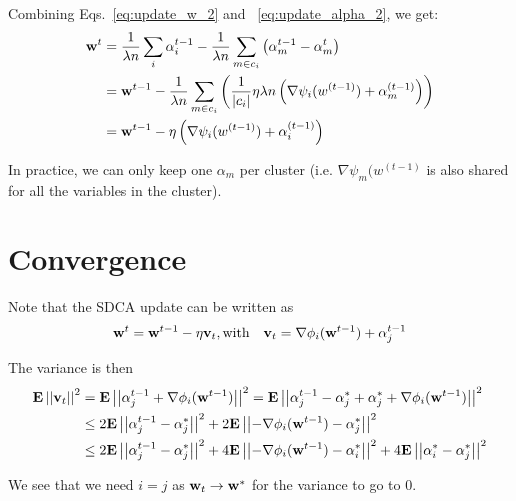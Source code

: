 \documentclass{article}
\begin{document}
Combining Eqs.~\ref{eq:update_w_2} and ~\ref{eq:update_alpha_2}, we get:
\begin{align}
{\bf w}^t &= \frac{1}{\lambda n} \sum_i \alpha_i^{t-1} - \frac{1}{\lambda n} \sum_{m \in c_i} \left( \alpha_m^{t-1} - \alpha_m^{t} \right) \nonumber \\
&= {\bf w}^{t-1} - \frac{1}{\lambda n} \sum_{m \in c_i} \left( \frac{1}{|c_i|} \eta \lambda n \left( \nabla \psi_i(w^{(t-1)}) + \alpha_m^{(t-1)} \right) \right) \nonumber \\
&= {\bf w}^{t-1} - \eta \left( \nabla \psi_i(w^{(t-1)}) + \alpha_i^{(t-1)} \right) \nonumber
\end{align}

In practice, we can only keep one $\alpha_m$ per cluster (i.e. $\nabla \psi_m(w^{(t-1)}$ is also shared for all the variables in the cluster).

\section{Convergence}

Note that the SDCA update can be written as
$$
{\bf w}^t = {\bf w}^{t-1} - \eta {\bf v}_t, \text{with} \quad {\bf v}_t = \nabla \phi_i ({\bf w}^{t-1}) + \alpha_j^{t-1}
$$

The variance is then
\begin{align}
{\mathbf E} \left|\left|{\bf v}_t\right|\right|^2 &= {\mathbf E} \left|\left|\alpha_j^{t-1} + \nabla \phi_i ({\bf w}^{t-1})\right|\right|^2 = {\mathbf E} \left|\left|\alpha_j^{t-1} - \alpha_j^* + \alpha_j^* + \nabla \phi_i ({\bf w}^{t-1})\right|\right|^2 \nonumber \\
&\leq 2 {\mathbf E} \left|\left|\alpha_j^{t-1} - \alpha_j^*\right|\right|^2 + 2 {\mathbf E} \left|\left|- \nabla \phi_i ({\bf w}^{t-1}) - \alpha_j^*\right|\right|^2 \nonumber \\
&\leq 2 {\mathbf E} \left|\left|\alpha_j^{t-1} - \alpha_j^*\right|\right|^2 \nonumber
+ 4 {\mathbf E} \left|\left|- \nabla \phi_i ({\bf w}^{t-1}) - \alpha_i^*\right|\right|^2 + 4 {\mathbf E} \left|\left|\alpha_i^* - \alpha_j^*\right|\right|^2 \nonumber \\
\end{align}

We see that we need $i = j$ as ${\bf w}_t \rightarrow {\bf w}^*$ for the variance to go to 0.
\end{document}
